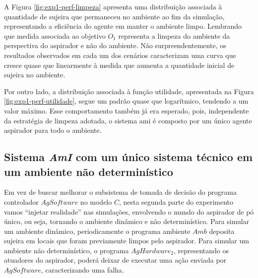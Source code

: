 A Figura \ref{fig:exp1-perf-limpeza} apresenta uma distribuição associada à quantidade de sujeira que permaneceu no ambiente ao fim da simulação, representando a eficiência do agente em manter o ambiente limpo. Lembrando que medida associada ao objetivo $O_1$ representa a limpeza do ambiente da perspectiva do aspirador e não do ambiente. Não surpreendentemente, os resultados observados em cada um dos cenários caracterizam uma curva que cresce quase que linearmente à medida que aumenta a quantidade inicial de sujeira no ambiente.

\begin{figure}[h!]
    \centering
\end{figure}

Por outro lado, a distribuição associada à função utilidade, apresentada na Figura \ref{fig:exp1-perf-utilidade}, segue um padrão quase que logarítmico, tendendo a um valor máximo. Esse comportamento também já era esperado, pois, independente da estratégia de limpeza adotada, o sistema \acrshort{ami} é composto por um único agente aspirador para todo o ambiente. 


\subsection{Sistema \textit{AmI} com um único sistema técnico em um ambiente não determinístico}
\label{sec:exp-dinamico}
Em vez de buscar melhorar o subsistema de tomada de decisão do programa controlador $AgSoftware$ no modelo $C$, nesta segunda parte do experimento vamos “injetar realidade” nas simulações, envolvendo o mundo do aspirador de pó único, ou seja, tornando o ambiente dinâmico e não determinístico. Para simular um ambiente dinâmico, periodicamente o programa ambiente $Amb$ deposita sujeira em locais que foram previamente limpos pelo aspirador. Para simular um ambiente não determinístico, o programa $AgHardware_2$, representando os atuadores do aspirador, poderá deixar de executar uma ação enviada por $AgSoftware$, caracterizando uma falha.

